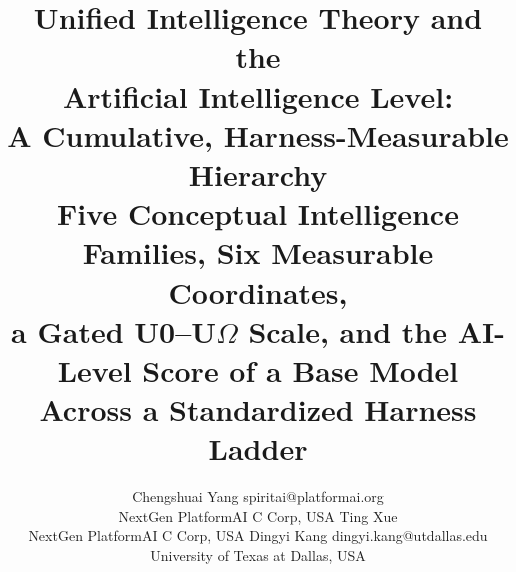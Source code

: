\renewcommand{\topfraction}{0.9}
\renewcommand{\bottomfraction}{0.7}
\renewcommand{\textfraction}{0.08}
\renewcommand{\floatpagefraction}{0.75}
\setcounter{topnumber}{3}
\setcounter{bottomnumber}{2}
\setcounter{totalnumber}{4}
\usepackage[section]{placeins}
\let\dkoldsubsection\subsection
\renewcommand{\subsection}{\FloatBarrier\dkoldsubsection}
\let\dkoldsubsubsection\subsubsection
\renewcommand{\subsubsection}{\FloatBarrier\dkoldsubsubsection}

\newcommand{\Om}{\ensuremath{\Omega}}
\newcommand{\SA}{\ensuremath{S_A(T,H)}}
\newcommand{\FA}{\ensuremath{F_A(H,p)}}
\newcommand{\rhov}{\ensuremath{\rho_V}}

\title{Unified Intelligence Theory and the\\
Artificial Intelligence Level:\\
A Cumulative, Harness-Measurable Hierarchy\\[6pt]
{\large Five Conceptual Intelligence Families, Six Measurable Coordinates,\\
a Gated U0--U\Om{} Scale, and the AI-Level Score of a Base Model\\
Across a Standardized Harness Ladder}}

\author{
      \name Chengshuai Yang \email spiritai@platformai.org \\
      \addr NextGen PlatformAI C Corp, USA
      \AND
      \name Ting Xue \\
      \addr NextGen PlatformAI C Corp, USA
      \AND
      \name Dingyi Kang \email dingyi.kang@utdallas.edu \\
      \addr University of Texas at Dallas, USA}




